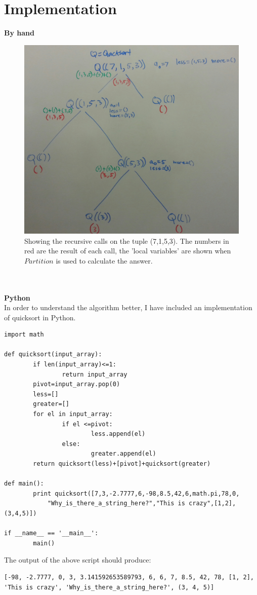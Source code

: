 \documentclass{article}
\begin{document}
\section{Implementation}
\textbf{By hand}
\begin{figure}[h!]
\centerline{\includegraphics[height = 3.5 in]{Quicksort.jpg}}
\caption{Showing the recursive calls on the tuple (7,1,5,3). The numbers in red are the result of each call, the 'local variables' are shown when $Partition$ is used to calculate the answer.}
\end{figure}
\\\\
\textbf{Python}\\
In order to understand the algorithm better, I have included an implementation of quicksort in Python.
\\
\begin{verbatim}
import math

def quicksort(input_array):
	    if len(input_array)<=1:
		        return input_array
	    pivot=input_array.pop(0)
	    less=[]
	    greater=[]
	    for el in input_array:
		        if el <=pivot:
			            less.append(el)
		        else:
			            greater.append(el)
	    return quicksort(less)+[pivot]+quicksort(greater)

def main():
	    print quicksort([7,3,-2.7777,6,-98,8.5,42,6,math.pi,78,0,
		    "Why_is_there_a_string_here?","This is crazy",[1,2],(3,4,5)])

if __name__ == '__main__':
	    main()
\end{verbatim}
The output of the above script should produce:\\
\begin{verbatim}
[-98, -2.7777, 0, 3, 3.141592653589793, 6, 6, 7, 8.5, 42, 78, [1, 2], 
'This is crazy', 'Why_is_there_a_string_here?', (3, 4, 5)]

\end{verbatim}
\end{document}
